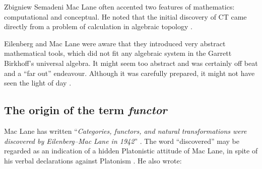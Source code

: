 \begin{artengenv}{Zbigniew Semadeni}
Mac Lane often accented two features of mathematics: computational and conceptual. 
He noted that the initial discovery of CT came directly from a problem of calculation 
in algebraic topology \parencite[p.333]{Century}.

Eilenberg and Mac Lane were aware that they introduced very abstract mathematical 
tools, which did not fit any algebraic system in the Garrett Birkhoff's universal 
algebra. It might seem too abstract and was certainly off beat and a ``far out'' 
endeavour. Although it was carefully prepared, it might not have 
seen the light of day \parencite[p.130]{MLonE}.

\subsection{The origin of the term \textit{functor} }
Mac Lane has written ``\textit{Categories, functors, and natural transformations 
were discovered by Eilenberg–Mac Lane in 1942}'' \parencite[p.29]{Working}. The word 
``discovered'' may be regarded as an indication of a hidden Platonistic attitude 
of Mac Lane, in spite of his verbal declarations against
Platonism \parencites[][pp.447--449]{Form}[][]{Krol}[][]{Skowron}. He also wrote: 



\end{artengenv}
